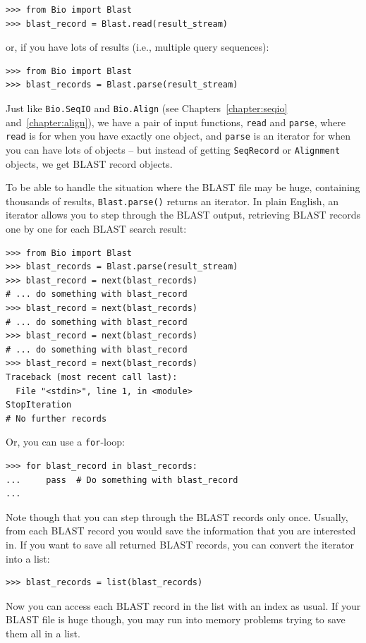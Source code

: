 \begin{verbatim}
>>> from Bio import Blast
>>> blast_record = Blast.read(result_stream)
\end{verbatim}

\noindent or, if you have lots of results (i.e., multiple query sequences):

\begin{verbatim}
>>> from Bio import Blast
>>> blast_records = Blast.parse(result_stream)
\end{verbatim}

Just like \verb|Bio.SeqIO| and \verb|Bio.Align|
(see Chapters~\ref{chapter:seqio} and~\ref{chapter:align}),
we have a pair of input functions, \verb|read| and \verb|parse|, where
\verb|read| is for when you have exactly one object, and \verb|parse|
is an iterator for when you can have lots of objects -- but instead of
getting \verb|SeqRecord| or \verb|Alignment| objects, we
get BLAST record objects.

To be able to handle the situation where the BLAST file may be huge,
containing thousands of results, \verb|Blast.parse()| returns an
iterator. In plain English, an iterator allows you to step through
the BLAST output, retrieving BLAST records one by one for each BLAST
search result:

\begin{verbatim}
>>> from Bio import Blast
>>> blast_records = Blast.parse(result_stream)
>>> blast_record = next(blast_records)
# ... do something with blast_record
>>> blast_record = next(blast_records)
# ... do something with blast_record
>>> blast_record = next(blast_records)
# ... do something with blast_record
>>> blast_record = next(blast_records)
Traceback (most recent call last):
  File "<stdin>", line 1, in <module>
StopIteration
# No further records
\end{verbatim}

Or, you can use a \verb|for|-loop:
\begin{verbatim}
>>> for blast_record in blast_records:
...     pass  # Do something with blast_record
...
\end{verbatim}

Note though that you can step through the BLAST records only once.
Usually, from each BLAST record you would save the information that
you are interested in. If you want to save all returned BLAST records,
you can convert the iterator into a list:
\begin{verbatim}
>>> blast_records = list(blast_records)
\end{verbatim}
Now you can access each BLAST record in the list with an index as usual.
If your BLAST file is huge though, you may run into memory problems trying to
save them all in a list.

